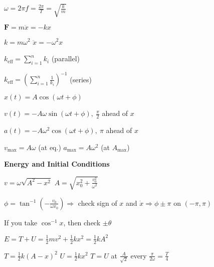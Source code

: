 \documentclass[twocolumn]{article}
\begin{document}
$\omega = 2 \pi f = \frac{2 \pi}{T} = \sqrt{\frac{k}{m}}$

$\textbf{F} = m \ddot{x} = -kx$

$k = m \omega^2$ \hfill $\ddot{x} = -\omega^2 x$

$k_{\text{eff}} = \sum\limits_{i=1}^n k_i$ (parallel)

$k_{\text{eff}} = \left( \sum\limits_{i=1}^n \frac{1}{k_i} \right)^{-1}$ (series)

\vspace{1em}

$x(t) = A \cos(\omega t + \phi)$

$v(t) = -A \omega \sin(\omega t + \phi),\ \frac{\pi}{2}$ ahead of $x$

$a(t) = -A \omega^2 \cos(\omega t + \phi),\ \pi$ ahead of $x$

$v_{\text{max}} = A \omega$ (at eq.) \hfill $a_{\text{max}} = A \omega ^2$ (at $A_{\text{max}}$)

\vspace{-.5em}

\dotfill

\textbf{Energy and Initial Conditions}

$v = \omega \sqrt{A^2 - x^2}$ \hspace{13.5em} $ A = \sqrt{x_0^2 + \frac{v_0^2}{\omega^2}}$

$\phi = \tan^{-1}\left( -\frac{v_0}{\omega x_0} \right) \Rightarrow$ check sign of $x$ and $\dot{x} \Rightarrow \phi \pm \pi$ on $(-\pi, \pi)$

If you take $\cos^{-1} x$, then check $\pm \theta$

$E = T + U = \frac{1}{2} mv^2 + \frac{1}{2}kx^2 = \frac{1}{2} kA^2$

$T = \frac{1}{2} k (A - x)^2$ \hfill $U = \frac{1}{2} k x^2$ \hfill $T = U$ at $\frac{A}{\sqrt{2}}$ every $\frac{\pi}{2\omega} = \frac{T}{4}$
\end{document}
